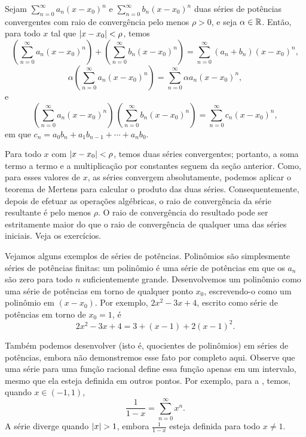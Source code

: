 \begin{prop}
Sejam $\sum_{n=0}^\infty a_n {(x-x_0)}^n$ e
$\sum_{n=0}^\infty b_n {(x-x_0)}^n$ duas séries de potências convergentes
com raio de convergência pelo menos $\rho > 0$, e seja $\alpha \in {\mathbb{R}}$. Então,
para todo $x$ tal que $\lvert {x-x_0} \rvert < \rho$, temos 
\begin{equation*}
\left(\sum_{n=0}^\infty a_n {(x-x_0)}^n\right)
+
\left(\sum_{n=0}^\infty b_n {(x-x_0)}^n\right)
=
\sum_{n=0}^\infty (a_n+b_n) {(x-x_0)}^n ,
\end{equation*}
\begin{equation*}
\alpha
\left(\sum_{n=0}^\infty a_n {(x-x_0)}^n\right)
=
\sum_{n=0}^\infty \alpha a_n {(x-x_0)}^n ,
\end{equation*}
e
\begin{equation*}
\left(\sum_{n=0}^\infty a_n {(x-x_0)}^n\right)
\,
\left(\sum_{n=0}^\infty b_n {(x-x_0)}^n\right)
=
\sum_{n=0}^\infty c_n {(x-x_0)}^n ,
\end{equation*}
em que
$c_n = a_0b_n + a_1 b_{n-1} + \cdots + a_n b_0$.
\end{prop}

Para todo $x$ com $\lvert {x-x_0} \rvert < \rho$, temos duas séries convergentes; portanto,
a soma termo a termo e a multiplicação por constantes
seguem da seção anterior.
Como, para esses valores de $x$, as séries convergem absolutamente,
podemos aplicar o teorema de Mertens para calcular o produto das duas séries.
Consequentemente, depois de efetuar as operações algébricas, o
raio de convergência da série resultante é pelo menos $\rho$.
O raio de convergência do resultado pode ser estritamente maior do que
o raio de convergência de qualquer uma das séries iniciais.
Veja os exercícios.

Vejamos alguns exemplos de séries de potências.
Polinômios são simplesmente séries de potências finitas: um polinômio
é uma série de potências em que
os $a_n$ são zero para todo $n$ suficientemente grande. Desenvolvemos
um polinômio como uma série de potências em torno de qualquer ponto $x_0$,
escrevendo-o como um polinômio em $(x-x_0)$. Por exemplo,
$2x^2-3x+4$, escrito como série de potências em torno de $x_0 = 1$, é
\begin{equation*}
2x^2-3x+4 = 3 + (x-1) + 2{(x-1)}^2 .
\end{equation*}

Também podemos desenvolver
\emph{} (isto é, quocientes de polinômios)
em séries de potências, embora não demonstremos esse fato por completo aqui.
Observe que uma série para uma função racional define essa função apenas
em um intervalo, mesmo que ela esteja definida em outros pontos. Por exemplo, para
a \emph{}, temos, quando
$x \in (-1,1)$,
\begin{equation*}
\frac{1}{1-x} =
\sum_{n=0}^\infty x^n .
\end{equation*}
A série diverge quando $\lvert {x} \rvert > 1$, embora $\frac{1}{1-x}$ esteja
definida para todo $x \neq 1$.

